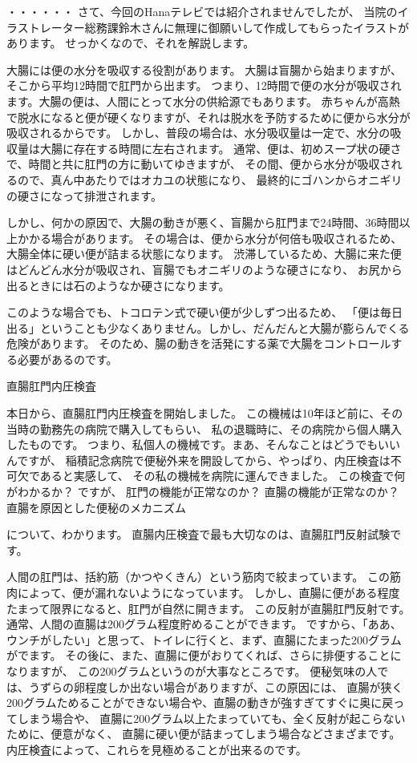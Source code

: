 ・・・・・・ 
さて、今回のHanaテレビでは紹介されませんでしたが、
当院のイラストレーター総務課鈴木さんに無理に御願いして作成してもらったイラストがあります。
せっかくなので、それを解説します。 

大腸には便の水分を吸収する役割があります。 
大腸は盲腸から始まりますが、そこから平均12時間で肛門から出ます。 
つまり、12時間で便の水分が吸収されます。大腸の便は、人間にとって水分の供給源でもあります。
赤ちゃんが高熱で脱水になると便が硬くなりますが、それは脱水を予防するために便から水分が吸収されるからです。
しかし、普段の場合は、水分吸収量は一定で、水分の吸収量は大腸に存在する時間に左右されます。 
通常、便は、初めスープ状の硬さで、時間と共に肛門の方に動いてゆきますが、 
その間、便から水分が吸収されるので、真ん中あたりではオカユの状態になり、
最終的にゴハンからオニギリの硬さになって排泄されます。 


しかし、何かの原因で、大腸の動きが悪く、盲腸から肛門まで24時間、36時間以上かかる場合があります。
その場合は、便から水分が何倍も吸収されるため、大腸全体に硬い便が詰まる状態になります。
渋滞しているため、大腸に来た便はどんどん水分が吸収され、盲腸でもオニギリのような硬さになり、
お尻から出るときには石のようなか硬さになります。 


このような場合でも、トコロテン式で硬い便が少しずつ出るため、
「便は毎日出る」ということも少なくありません。しかし、だんだんと大腸が膨らんでくる危険があります。
そのため、腸の動きを活発にする薬で大腸をコントロールする必要があるのです。 

直腸肛門内圧検査

本日から、直腸肛門内圧検査を開始しました。
この機械は10年ほど前に、その当時の勤務先の病院で購入してもらい、
私の退職時に、その病院から個人購入したものです。
つまり、私個人の機械です。まあ、そんなことはどうでもいいんですが、
稲積記念病院で便秘外来を開設してから、やっぱり、内圧検査は不可欠であると実感して、
その私の機械を病院に運んできました。
この検査で何がわかるか？
ですが、
肛門の機能が正常なのか？
直腸の機能が正常なのか？
直腸を原因とした便秘のメカニズム

について、わかります。
直腸内圧検査で最も大切なのは、直腸肛門反射試験です。

人間の肛門は、括約筋（かつやくきん）という筋肉で絞まっています。
この筋肉によって、便が漏れないようになっています。
しかし、直腸に便がある程度たまって限界になると、肛門が自然に開きます。
この反射が直腸肛門反射です。通常、人間の直腸は200グラム程度貯めることができます。
ですから、「ああ、ウンチがしたい」と思って、トイレに行くと、まず、直腸にたまった200グラムがでます。
その後に、また、直腸に便がおりてくれば、さらに排便することになりますが、
この200グラムというのが大事なところです。
便秘気味の人では、うずらの卵程度しか出ない場合がありますが、この原因には、
直腸が狭く200グラムためることができない場合や、直腸の動きが強すぎてすぐに奥に戻ってしまう場合や、
直腸に200グラム以上たまっていても、全く反射が起こらないために、便意がなく、
直腸に硬い便が詰まってしまう場合などさまざまです。
内圧検査によって、これらを見極めることが出来るのです。

